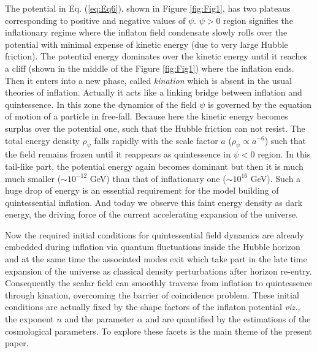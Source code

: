 \documentclass[a4paper,11pt]{article}
\begin{document}
The potential in Eq. (\ref{eq:Eq6}), shown in Figure \ref{fig:Fig1}, has two plateaus corresponding to positive and negative values of $\psi$. $\psi>0$ region signifies the inflationary regime where the inflaton field condensate slowly rolls over the potential with minimal expense of kinetic energy (due to very large Hubble friction). The potential energy dominates over the kinetic energy until it reaches a cliff (shown in the middle of the Figure \ref{fig:Fig1}) where the inflation ends. Then it enters into a new phase, called \textit{kination} which is absent in the usual theories of inflation. Actually it acts like a linking bridge between inflation and quintessence. In this zone the dynamics of the field $\psi$ is governed by the equation of motion of a particle in free-fall. Because here the kinetic energy becomes surplus over the potential one, such that the Hubble friction can not resist. The total energy density $\rho_\psi$ falls rapidly with the scale factor $a$ ($\rho_\psi\propto a^{-6}$) \cite{Dimopoulos:2022wzo} such that the field remains frozen \cite{Dimopoulos:2021xld} until it reappears as quintessence in $\psi<0$ region. In this tail-like part, the potential energy again becomes dominant but then it is much much smaller ($\sim 10^{-12}$ GeV) than that of inflationary one ($\sim 10^{16}$ GeV). Such a huge drop of energy is an essential requirement for the model building of quintessential inflation. And today we observe this faint energy density as dark energy, the driving force of the current accelerating expansion of the universe.\par Now the required initial conditions for quintessential field dynamics are already embedded during inflation via quantum fluctuations inside the Hubble horizon and at the same time the associated modes exit which take part in the late time expansion of the universe as classical density perturbations after horizon re-entry. Consequently the scalar field can smoothly traverse from inflation to quintessence through kination, overcoming the barrier of coincidence problem. These initial conditions are actually fixed by the shape factors of the inflaton potential \textit{viz.,} the exponent $n$ and the parameter $\alpha$ and are quantified by the estimations of the cosmological parameters. To explore these facets is the main theme of the present paper.
\end{document}
